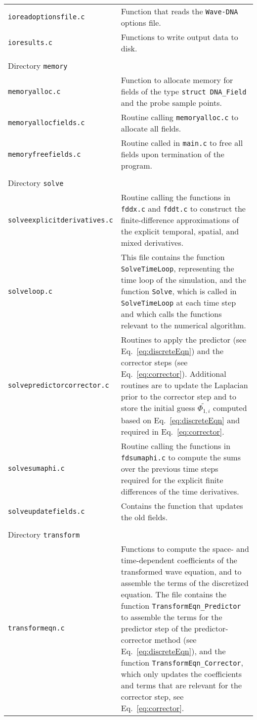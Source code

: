 \begin{longtable}{p{} p{}}
{\tt ioreadoptionsfile.c} & Function that reads the {\tt Wave-DNA} options file. \\
{\tt ioresults.c} & Functions to write output data to disk. \\
\\
\hline Directory {\tt memory} &\\ \hline
{\tt memoryalloc.c} & Function to allocate memory for fields of the type {\tt struct DNA\_Field} and the probe sample points.\\
{\tt memoryallocfields.c} & Routine calling {\tt memoryalloc.c} to allocate all fields. \\
{\tt memoryfreefields.c} & Routine called in {\tt main.c} to free all fields upon termination of the program. \\
\\
\hline Directory {\tt solve} &\\ \hline
{\tt solveexplicitderivatives.c} & Routine calling the functions in {\tt fddx.c} and {\tt fddt.c} to construct the finite-difference approximations of the explicit temporal, spatial, and mixed derivatives. \\
{\tt solveloop.c} & This file contains the function {\tt SolveTimeLoop}, representing the time loop of the simulation, and the function {\tt Solve}, which is called in {\tt {\tt SolveTimeLoop}} at each time step and which calls the functions relevant to the numerical algorithm. \\
{\tt solvepredictorcorrector.c} & Routines to apply the predictor (see Eq.~\eqref{eq:discreteEqn}) and the corrector steps (see Eq.~\eqref{eq:corrector}). Additional routines are to update the Laplacian prior to the corrector step and to store the initial guess $\widetilde{\Phi_{1,i}}$ computed based on Eq.~\eqref{eq:discreteEqn} and required in Eq.~\eqref{eq:corrector}. \\
{\tt solvesumaphi.c} & Routine calling the functions in {\tt fdsumaphi.c} to compute the sums over the previous time steps required for the explicit finite differences of the time derivatives. \\
{\tt solveupdatefields.c} & Contains the function that updates the old fields. \\
\\
\hline Directory {\tt transform} &\\ \hline
{\tt transformeqn.c} & Functions to compute the space- and time-dependent coefficients of the transformed wave equation, and to assemble the terms of the discretized equation. The file contains the function {\tt TransformEqn\_Predictor} to assemble the terms for the predictor step of the predictor-corrector method (see Eq.~\eqref{eq:discreteEqn}), and the function {\tt TransformEqn\_Corrector}, which only updates the coefficients and terms that are relevant for the corrector step, see Eq.~\eqref{eq:corrector}.\\

\end{longtable}
